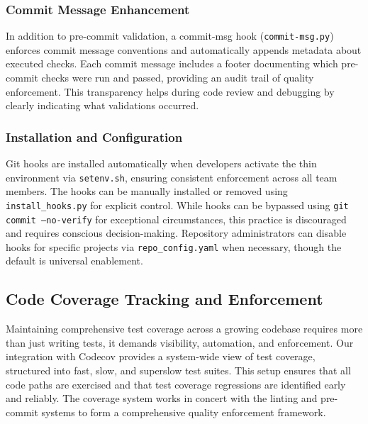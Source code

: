 \subsubsection{Commit Message Enhancement}
In addition to pre-commit validation, a commit-msg hook (\texttt{commit-msg.py})
enforces commit message conventions and automatically appends metadata
about executed checks. Each commit message includes a footer documenting
which pre-commit checks were run and passed, providing an audit trail of
quality enforcement. This transparency helps during code review and debugging
by clearly indicating what validations occurred.

\subsubsection{Installation and Configuration}
Git hooks are installed automatically when developers activate the thin
environment via \texttt{setenv.sh}, ensuring consistent enforcement
across all team members. The hooks can be manually installed or removed using
\texttt{install\_hooks.py} for explicit control. While hooks can be bypassed
using \texttt{git commit --no-verify} for exceptional circumstances, this
practice is discouraged and requires conscious decision-making.
Repository administrators can disable hooks for specific projects via
\texttt{repo\_config.yaml} when necessary, though the default is
universal enablement.

\subsection{Code Coverage Tracking and Enforcement}
Maintaining comprehensive test coverage across a growing codebase requires
more than just writing tests, it demands visibility, automation, and
enforcement. Our integration with Codecov provides a system-wide view of
test coverage, structured into fast, slow, and superslow test suites. This
setup ensures that all code paths are exercised and that test coverage regressions
are identified early and reliably. The coverage system works in concert
with the linting and pre-commit systems to form a comprehensive quality
enforcement framework.

